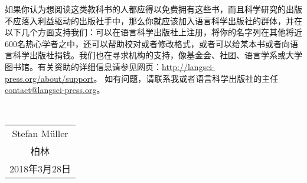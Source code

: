 
如果你认为想阅读这类教科书的人都应得以免费拥有这些书，而且科学研究的出版不应落入利益驱动的出版社手中，那么你就应该加入语言科学出版社的群体，并在以下几个方面支持我们：可以在语言科学出版社上注册，将你的名字列在其他将近600名热心学者之中，还可以帮助校对或者修改格式，或者可以给某本书或者向语言科学出版社捐钱。我们也在寻求机构的支持，像基金会、社团、语言学系或大学图书馆。有关资助的详细信息请参见网页：\url{http://langsci-press.org/about/support}。
如有问题，请联系我或者语言科学出版社的主任 \href{mailto:contact@langsci-press.org}{contact@langsci-press.org}。


~\medskip

\begin{flushright}
\begin{tabular}{c}
Stefan Müller\\
柏林\\
2018年3月28日\\
\end{tabular}
\end{flushright}

